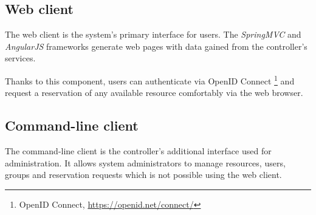 \subsection{Web client} \label{webclient}
The web client is the system's primary interface for users. The \emph{SpringMVC} and \emph{AngularJS} frameworks generate web pages with data gained from the controller’s services.

Thanks to this component, users can authenticate via OpenID Connect \footnote{OpenID Connect, \url{https://openid.net/connect/}} and request a reservation of any available resource comfortably via the web browser.

\subsection{Command-line client}
The command-line client is the controller's additional interface used for administration. It allows system administrators to manage resources, users, groups and reservation requests which is not possible using the web client.


